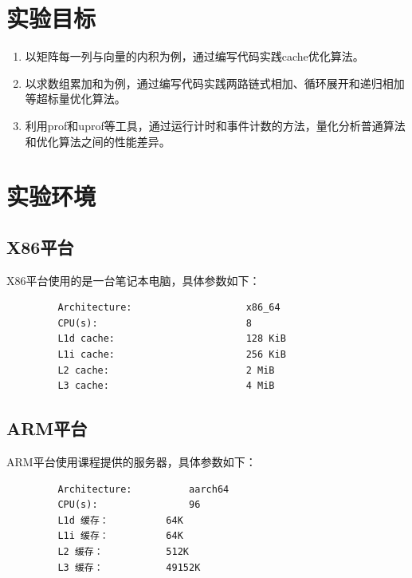\documentclass[a4paper]{article}
\begin{document}
\section{实验目标}
    \begin{enumerate}
      \item 以矩阵每一列与向量的内积为例，通过编写代码实践cache优化算法。
      \item 以求数组累加和为例，通过编写代码实践两路链式相加、循环展开和递归相加等超标量优化算法。
      \item 利用prof和uprof等工具，通过运行计时和事件计数的方法，量化分析普通算法和优化算法之间的性能差异。
    \end{enumerate}
\section{实验环境}
   \subsection{X86平台}
      X86平台使用的是一台笔记本电脑，具体参数如下：
      \begin{verbatim}
         Architecture:                    x86_64
         CPU(s):                          8
         L1d cache:                       128 KiB
         L1i cache:                       256 KiB
         L2 cache:                        2 MiB
         L3 cache:                        4 MiB
      \end{verbatim}
  \subsection{ARM平台}
  ARM平台使用课程提供的服务器，具体参数如下：
      \begin{verbatim}
         Architecture:          aarch64
         CPU(s):                96
         L1d 缓存：          64K
         L1i 缓存：          64K
         L2 缓存：           512K
         L3 缓存：           49152K
      \end{verbatim}
\end{document}
